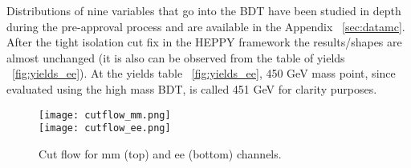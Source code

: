Distributions of nine variables that go into the BDT have been studied in depth during the pre-approval process and are available in the Appendix ~\ref{sec:datamc}. After the tight isolation cut fix in the HEPPY framework the results/shapes are almost unchanged (it is also can be observed from the table of yields ~\ref{fig:yields_ee}).  At the yields table ~\ref{fig:yields_ee}, 450 GeV mass point, since evaluated using the high mass BDT, is called 451 GeV for clarity purposes. 



\begin{figure}[tbp]
  \begin{center}
    \texttt{[image: cutflow\_mm.png]}\\
    \texttt{[image: cutflow\_ee.png]}\\
    \caption{Cut flow for mm (top) and ee (bottom) channels. }
    \label{fig:cutFlow}
  \end{center}
\end{figure}





